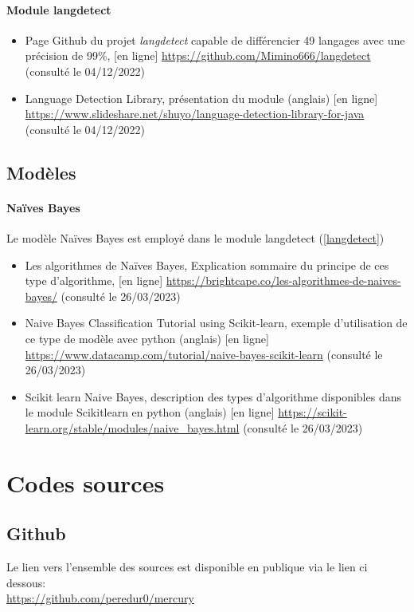 \documentclass[a4paper,12pt]{article}
\begin{document}
			\paragraph{Module langdetect}
			\begin{itemize}
				\item Page Github du projet \emph{langdetect} capable de différencier 49 langages avec une précision de 99\%, [en ligne] \url{https://github.com/Mimino666/langdetect} (consulté le 04/12/2022) \label{langdetect}
				\item Language Detection Library, présentation du module (anglais) [en ligne] \url{https://www.slideshare.net/shuyo/language-detection-library-for-java} (consulté le 04/12/2022)
			\end{itemize}
			
		\subsection{Modèles}
			\paragraph{Naïves Bayes}
				Le modèle Naïves Bayes est employé dans le module langdetect (\ref{langdetect})
			\begin{itemize}
				\item Les algorithmes de Naïves Bayes, Explication sommaire du principe de ces type d'algorithme, [en ligne] \url{https://brightcape.co/les-algorithmes-de-naives-bayes/} (consulté le 26/03/2023)
				\item Naive Bayes Classification Tutorial using Scikit-learn, exemple d'utilisation de ce type de modèle avec python (anglais) [en ligne] \url{https://www.datacamp.com/tutorial/naive-bayes-scikit-learn} (consulté le 26/03/2023)
				\item Scikit learn Naive Bayes, description des types d'algorithme disponibles dans le module Scikitlearn en python (anglais) [en ligne] \url{https://scikit-learn.org/stable/modules/naive_bayes.html} (consulté le 26/03/2023)
			\end{itemize}
			
	\section{Codes sources}
		\subsection{Github}
			Le lien vers l'ensemble des sources est disponible en publique via le lien ci dessous:\\
			\url{https://github.com/peredur0/mercury}
			
\end{document}

